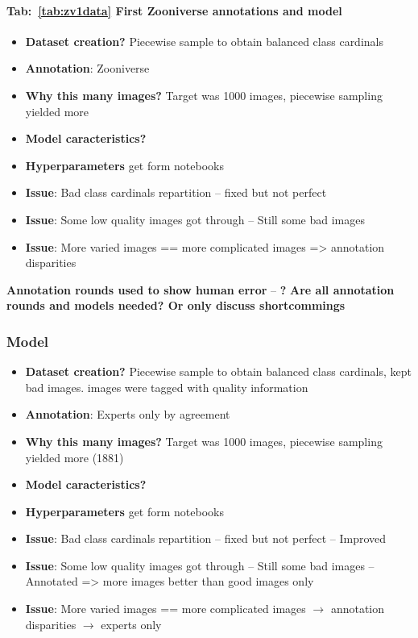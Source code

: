 \documentclass[english]{article}
\begin{document}
\paragraph{Tab:~\ref{tab:zv1data} First Zooniverse annotations and model}
\begin{itemize}
	\item \textbf{Dataset creation?} Piecewise sample to obtain balanced class cardinals
	\item \textbf{Annotation}: Zooniverse
	\item \textbf{Why this many images?} Target was 1000 images, piecewise sampling yielded more
	\item \textbf{Model caracteristics?}~\parencite{dosovitskiyImageWorth16x162021}
	\item \textbf{Hyperparameters} get form notebooks
	\item \textbf{Issue}: Bad class cardinals repartition -- fixed but not perfect
	\item \textbf{Issue}: Some low quality images got through -- Still some bad images
	\item \textbf{Issue}: More varied images == more complicated images => annotation disparities
\end{itemize}

\textbf{Annotation rounds used to show human error} -- \textbf{?}
\textbf{Are all annotation rounds and models needed? Or only discuss shortcommings}

\subsubsection{Model}


\begin{itemize}
	\item \textbf{Dataset creation?} Piecewise sample to obtain balanced class cardinals, kept bad images. images were tagged with quality information
	\item \textbf{Annotation}: Experts only by agreement
	\item \textbf{Why this many images?} Target was 1000 images, piecewise sampling yielded more (1881)
	\item \textbf{Model caracteristics?}~\parencite{dosovitskiyImageWorth16x162021}
	\item \textbf{Hyperparameters} get form notebooks
	\item \textbf{Issue}: Bad class cardinals repartition -- fixed but not perfect -- Improved
	\item \textbf{Issue}: Some low quality images got through -- Still some bad images -- Annotated => more images better than good images only
	\item \textbf{Issue}: More varied images == more complicated images $\rightarrow$ annotation disparities $\rightarrow$ experts only
\end{itemize}
\end{document}
